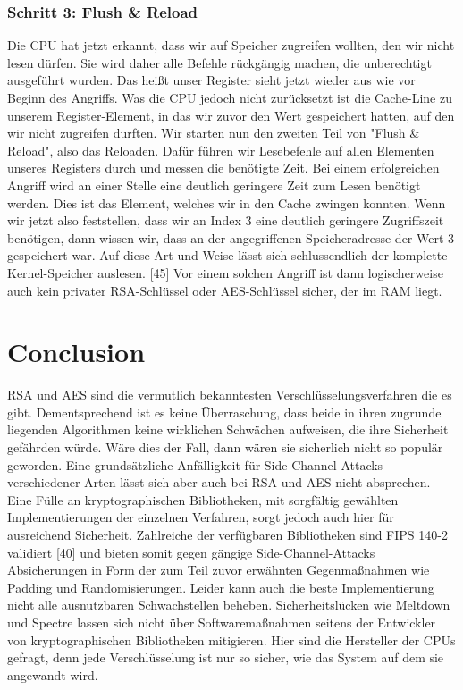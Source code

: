 \documentclass[conference,10pt,a4paper,twocolumn]{IEEEtran}
\begin{document}
\bigskip
\subsubsection{Schritt 3: Flush {\&} Reload}
Die CPU hat jetzt erkannt, dass wir auf Speicher zugreifen wollten, den wir nicht lesen dürfen. Sie wird daher alle Befehle rückgängig machen, die unberechtigt ausgeführt wurden. Das heißt unser Register sieht jetzt wieder aus wie vor Beginn des Angriffs. Was die CPU jedoch nicht zurücksetzt ist die Cache-Line zu unserem Register-Element, in das wir zuvor den Wert gespeichert hatten, auf den wir nicht zugreifen durften. Wir starten nun den zweiten Teil von "Flush {\&} Reload", also das Reloaden. Dafür führen wir Lesebefehle auf allen Elementen unseres Registers durch und messen die benötigte Zeit. Bei einem erfolgreichen Angriff wird an einer Stelle eine deutlich geringere Zeit zum Lesen benötigt werden. Dies ist das Element, welches wir in den Cache zwingen konnten. Wenn wir jetzt also feststellen, dass wir an Index 3 eine deutlich geringere Zugriffszeit benötigen, dann wissen wir, dass an der angegriffenen Speicheradresse der Wert 3 gespeichert war. Auf diese Art und Weise lässt sich schlussendlich der komplette Kernel-Speicher auslesen. [45] \linebreak
Vor einem solchen Angriff ist dann logischerweise auch kein privater RSA-Schlüssel oder AES-Schlüssel sicher, der im RAM liegt.

\section{Conclusion}
RSA und AES sind die vermutlich bekanntesten Verschlüsselungsverfahren die es gibt. Dementsprechend ist es keine Überraschung, dass beide in ihren zugrunde liegenden Algorithmen keine wirklichen Schwächen aufweisen, die ihre Sicherheit gefährden würde. Wäre dies der Fall, dann wären sie sicherlich nicht so populär geworden. Eine grundsätzliche Anfälligkeit für Side-Channel-Attacks verschiedener Arten lässt sich aber auch bei RSA und AES nicht absprechen. Eine Fülle an kryptographischen Bibliotheken, mit sorgfältig gewählten Implementierungen der einzelnen Verfahren, sorgt jedoch auch hier für ausreichend Sicherheit. Zahlreiche der verfügbaren Bibliotheken sind FIPS 140-2 validiert [40] und bieten somit gegen gängige Side-Channel-Attacks Absicherungen in Form der zum Teil zuvor erwähnten Gegenmaßnahmen wie Padding und Randomisierungen. \linebreak
Leider kann auch die beste Implementierung nicht alle ausnutzbaren Schwachstellen beheben. Sicherheitslücken wie Meltdown und Spectre lassen sich nicht über Softwaremaßnahmen seitens der Entwickler von kryptographischen Bibliotheken mitigieren. Hier sind die Hersteller der CPUs gefragt, denn jede Verschlüsselung ist nur so sicher, wie das System auf dem sie angewandt wird. \newpage
\end{document}

